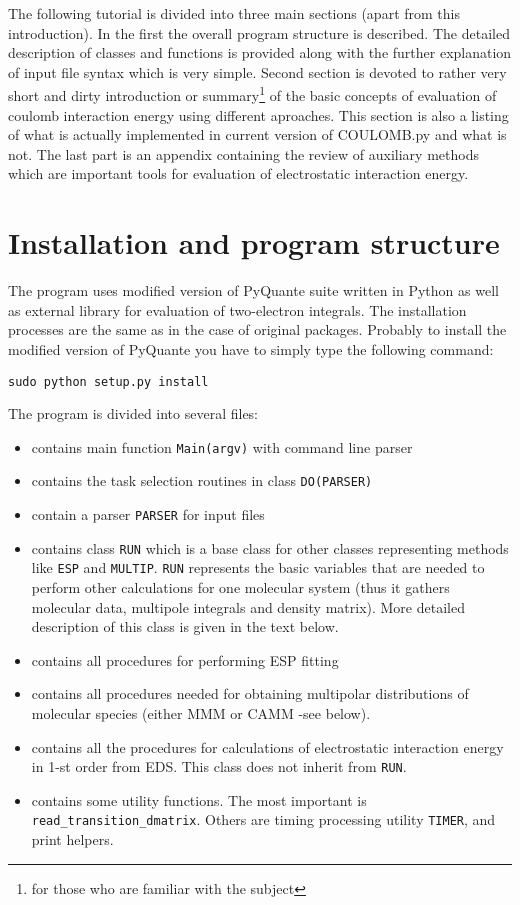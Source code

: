 \documentclass[a4paper,titlepage,twoside,fleqn]{article}
\begin{document}
The following tutorial is divided into three main sections (apart from this introduction).
In the first the overall program structure is described. The detailed
description of classes and functions is provided along with the further 
explanation of input file syntax which is very simple. Second section
is devoted to rather very short and dirty introduction or summary\footnote{for 
those who are familiar with the subject} of the basic concepts of evaluation 
of coulomb interaction energy using different aproaches. This section is 
also a listing of what is actually implemented in current version of {\rm COULOMB.py}
and what is not. The last part is an appendix containing the review of auxiliary methods
which are important tools for evaluation of electrostatic interaction energy. 

\section{Installation and program structure}

The program uses modified version of PyQuante suite written in Python as
well as external library for evaluation of two-electron integrals. The
installation processes are the same as in the case of original packages.
Probably to install the modified version of PyQuante you have to simply type
the following command:
\begin{verbatim}
sudo python setup.py install
\end{verbatim}

The program is divided into several files:
\begin{itemize}
\item[\verb+coulomb.py+] contains main function \verb+Main(argv)+ with command 
     line parser
\item[\verb+do.py+] contains the task selection routines in class \verb+DO(PARSER)+ 
\item[\verb+parser.py+] contain a parser \verb+PARSER+ for input files
\item[\verb+run.py+] contains class \verb+RUN+ which is a base class for other classes
     representing methods like \verb+ESP+ and \verb+MULTIP+. \verb+RUN+ represents
     the basic variables that are needed to perform other calculations for one
     molecular system (thus it gathers molecular data, multipole integrals and density 
     matrix). More detailed description of this class is given in the text below.
\item[\verb+esp.py+] contains all procedures for performing ESP fitting
\item[\verb+multip.py+] contains all procedures needed for obtaining multipolar 
     distributions of molecular species (either MMM or CAMM -see below).
\item[\verb+eeleds.py+] contains all the procedures for calculations of electrostatic
     interaction energy in 1-st order from EDS. This class does not inherit from \verb+RUN+.
\item[\verb+util.py+] contains some utility functions. The most important is 
     \verb+read_transition_dmatrix+. Others are timing processing utility \verb+TIMER+,
     and print helpers.
\end{itemize}
\end{document}
